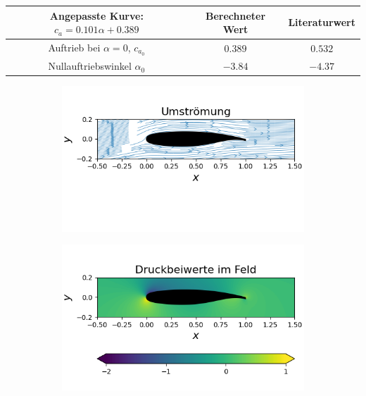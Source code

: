 \begin{table}[H]
\label{tab:sc20614cawerte}
\begin{center}
\begin{tabular}{c|cc}
Angepasste Kurve: $c_a = 0.101 \alpha + 0.389$ & Berechneter Wert & Literaturwert \cite{bigfoil} \\
\midrule
Auftrieb bei $\alpha = 0$, $c_{a_0}$ & $0.389$ & $0.532$ \\
Nullauftriebswinkel $\alpha_{0}$ & $-3.84$ & $-4.37$ 
\end{tabular}
\end{center}
\end{table}

\begin{figure}[!ht]
  \centering
  \begin{subfigure}[b]{0.475\linewidth}
    \centering\includegraphics[scale=0.5]{figures/sc20614stream.png} 
  \end{subfigure}
  \hfill
  \begin{subfigure}[b]{0.475\linewidth}
    \centering\includegraphics[scale=0.5]{figures/sc20614contourcp.png} 

\end{subfigure}
\end{figure}
